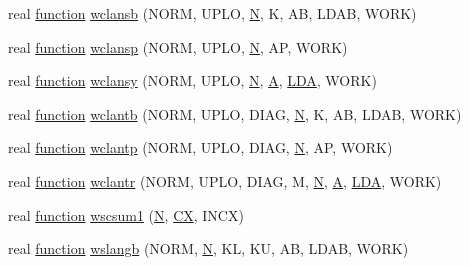 \begin{DoxyCompactItemize}
\item 
real \hyperlink{afunc_8m_a7b5e596df91eadea6c537c0825e894a7}{function} \hyperlink{wrap__accelerate__f_8f_ac65b84f8809cee28af89e6d1c31a0db2}{wclansb} (N\+O\+R\+M, U\+P\+L\+O, \hyperlink{polmisc_8c_a0240ac851181b84ac374872dc5434ee4}{N}, K, A\+B, L\+D\+A\+B, W\+O\+R\+K)
\item 
real \hyperlink{afunc_8m_a7b5e596df91eadea6c537c0825e894a7}{function} \hyperlink{wrap__accelerate__f_8f_a02b78e8d97211f8f821ac078ef74978c}{wclansp} (N\+O\+R\+M, U\+P\+L\+O, \hyperlink{polmisc_8c_a0240ac851181b84ac374872dc5434ee4}{N}, A\+P, W\+O\+R\+K)
\item 
real \hyperlink{afunc_8m_a7b5e596df91eadea6c537c0825e894a7}{function} \hyperlink{wrap__accelerate__f_8f_aeed68e4a00da4a4808f7930add8faa21}{wclansy} (N\+O\+R\+M, U\+P\+L\+O, \hyperlink{polmisc_8c_a0240ac851181b84ac374872dc5434ee4}{N}, \hyperlink{classA}{A}, \hyperlink{example__user_8c_ae946da542ce0db94dced19b2ecefd1aa}{L\+D\+A}, W\+O\+R\+K)
\item 
real \hyperlink{afunc_8m_a7b5e596df91eadea6c537c0825e894a7}{function} \hyperlink{wrap__accelerate__f_8f_aa7c574819d79e71bb9682e19f9312945}{wclantb} (N\+O\+R\+M, U\+P\+L\+O, D\+I\+A\+G, \hyperlink{polmisc_8c_a0240ac851181b84ac374872dc5434ee4}{N}, K, A\+B, L\+D\+A\+B, W\+O\+R\+K)
\item 
real \hyperlink{afunc_8m_a7b5e596df91eadea6c537c0825e894a7}{function} \hyperlink{wrap__accelerate__f_8f_aed0a2dd9279e2321a6b19854ab65e644}{wclantp} (N\+O\+R\+M, U\+P\+L\+O, D\+I\+A\+G, \hyperlink{polmisc_8c_a0240ac851181b84ac374872dc5434ee4}{N}, A\+P, W\+O\+R\+K)
\item 
real \hyperlink{afunc_8m_a7b5e596df91eadea6c537c0825e894a7}{function} \hyperlink{wrap__accelerate__f_8f_a36d4e66050f874cc703de63f70f8a28a}{wclantr} (N\+O\+R\+M, U\+P\+L\+O, D\+I\+A\+G, M, \hyperlink{polmisc_8c_a0240ac851181b84ac374872dc5434ee4}{N}, \hyperlink{classA}{A}, \hyperlink{example__user_8c_ae946da542ce0db94dced19b2ecefd1aa}{L\+D\+A}, W\+O\+R\+K)
\item 
real \hyperlink{afunc_8m_a7b5e596df91eadea6c537c0825e894a7}{function} \hyperlink{wrap__accelerate__f_8f_a4fe7a7920d1389fac7610039fbf54652}{wscsum1} (\hyperlink{polmisc_8c_a0240ac851181b84ac374872dc5434ee4}{N}, \hyperlink{scsum1_8c_a5a76da95c549c41790389a76e12fdcb5}{C\+X}, I\+N\+C\+X)
\item 
real \hyperlink{afunc_8m_a7b5e596df91eadea6c537c0825e894a7}{function} \hyperlink{wrap__accelerate__f_8f_ad83a600c3c4a858a0f5f7aadef725dde}{wslangb} (N\+O\+R\+M, \hyperlink{polmisc_8c_a0240ac851181b84ac374872dc5434ee4}{N}, K\+L, K\+U, A\+B, L\+D\+A\+B, W\+O\+R\+K)

\end{DoxyCompactItemize}
